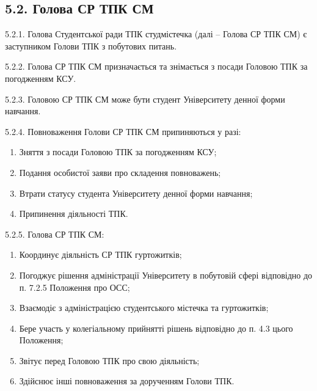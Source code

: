 \subsection*{5.2. Голова СР ТПК СМ}
    5.2.1. Голова Студентської ради ТПК студмістечка (далі -- Голова СР ТПК СМ) є заступником Голови ТПК з побутових питань.

    5.2.2. Голова СР ТПК СМ призначається та знімається з посади Головою ТПК за погодженням КСУ.

    5.2.3. Головою СР ТПК СМ може бути студент Університету денної форми навчання.

    5.2.4. Повноваження Голови СР ТПК СМ припиняються у разі:

        \begin{enumerate}[label=\alph*)]
            \item Зняття з посади Головою ТПК за погодженням КСУ;
            \item Подання особистої заяви про складення повноважень;
            \item Втрати статусу студента Університету денної форми навчання;
            \item Припинення діяльності ТПК.
        \end{enumerate}

    5.2.5. Голова СР ТПК СМ:

        \begin{enumerate}[label=\alph*)]
            \item Координує діяльність СР ТПК гуртожитків;
            \item Погоджує рішення адміністрації Університету в побутовій сфері відповідно до п. 7.2.5 Положення про ОСС;
            \item Взаємодіє з адміністрацією студентського містечка та гуртожитків;
            \item Бере участь у колегіальному прийнятті рішень відповідно до п. 4.3 цього Положення;
            \item Звітує перед Головою ТПК про свою діяльність;
            \item Здійснює інші повноваження за дорученням Голови ТПК.
        \end{enumerate}
